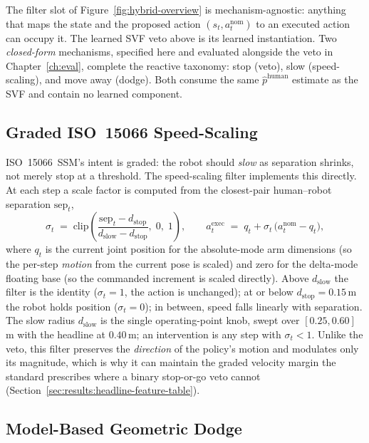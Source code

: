 \documentclass[11pt,a4paper]{report}
\newcommand{\ssm}{SSM}
\newcommand{\iso}{ISO~15066}
\begin{document}
The filter slot of Figure~\ref{fig:hybrid-overview} is
mechanism-agnostic: anything that maps the state and the proposed
action $(s_t, a^{\mathrm{nom}}_t)$ to an executed action can occupy
it. The learned SVF veto above is its learned instantiation. Two
\emph{closed-form} mechanisms, specified here and evaluated alongside
the veto in Chapter~\ref{ch:eval}, complete the reactive taxonomy:
stop (veto), slow (speed-scaling), and move away (dodge). Both
consume the same $\hat{p}^{\mathrm{human}}$ estimate as the SVF and
contain no learned component.

\subsection{Graded \iso{} Speed-Scaling}
\label{sec:method:filter:speedscale}

\iso{}~\ssm{}'s intent is graded: the robot should \emph{slow} as
separation shrinks, not merely stop at a threshold. The speed-scaling
filter implements this directly. At each step a scale factor is
computed from the closest-pair human--robot separation
$\mathrm{sep}_t$,
\begin{equation}
  \sigma_t \;=\; \mathrm{clip}\!\left(
    \frac{\mathrm{sep}_t - d_{\mathrm{stop}}}
         {d_{\mathrm{slow}} - d_{\mathrm{stop}}},\; 0,\; 1\right),
  \qquad
  a^{\mathrm{exec}}_t \;=\; q_t + \sigma_t \,
    \bigl(a^{\mathrm{nom}}_t - q_t\bigr),
  \label{eq:speed-scale}
\end{equation}
where $q_t$ is the current joint position for the absolute-mode arm
dimensions (so the per-step \emph{motion} from the current pose is
scaled) and zero for the delta-mode floating base (so the commanded
increment is scaled directly). Above $d_{\mathrm{slow}}$ the filter
is the identity ($\sigma_t = 1$, the action is unchanged); at or
below $d_{\mathrm{stop}} = 0.15$\,m the robot holds position
($\sigma_t = 0$); in between, speed falls linearly with separation.
The slow radius $d_{\mathrm{slow}}$ is the single operating-point
knob, swept over $[0.25, 0.60]$\,m with the headline at $0.40$\,m;
an intervention is any step with $\sigma_t < 1$. Unlike the veto,
this filter preserves the \emph{direction} of the policy's motion
and modulates only its magnitude, which is why it can maintain the
graded velocity margin the standard prescribes where a binary
stop-or-go veto cannot
(Section~\ref{sec:results:headline-feature-table}).

\subsection{Model-Based Geometric Dodge}
\label{sec:method:filter:dodge}
\end{document}

